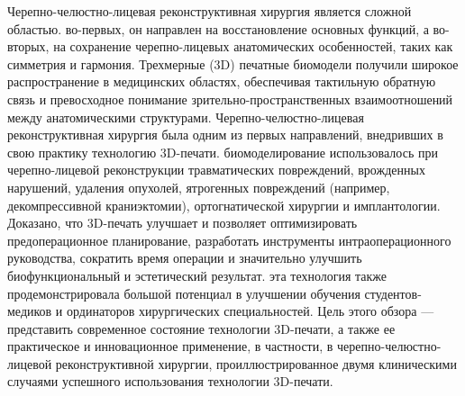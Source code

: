 Черепно-челюстно-лицевая реконструктивная хирургия является сложной областью.
во-первых, он направлен на восстановление основных функций, а во-вторых, на
сохранение черепно-лицевых анатомических особенностей, таких как симметрия и
гармония. Трехмерные (3D) печатные биомодели получили широкое распространение в
медицинских областях, обеспечивая тактильную обратную связь и превосходное
понимание зрительно-пространственных взаимоотношений между анатомическими
структурами. Черепно-челюстно-лицевая реконструктивная хирургия была одним из
первых направлений, внедривших в свою практику технологию 3D-печати.
биомоделирование использовалось при черепно-лицевой реконструкции травматических
повреждений, врожденных нарушений, удаления опухолей, ятрогенных повреждений
(например, декомпрессивной краниэктомии), ортогнатической хирургии и
имплантологии. Доказано, что 3D-печать улучшает и позволяет оптимизировать
предоперационное планирование, разработать инструменты интраоперационного
руководства, сократить время операции и значительно улучшить биофункциональный и
эстетический результат. эта технология также продемонстрировала большой
потенциал в улучшении обучения студентов-медиков и ординаторов хирургических
специальностей. Цель этого обзора — представить современное состояние технологии
3D-печати, а также ее практическое и инновационное применение, в частности, в
черепно-челюстно-лицевой реконструктивной хирургии, проиллюстрированное двумя
клиническими случаями успешного использования технологии 3D-печати.\cite{28523082}


